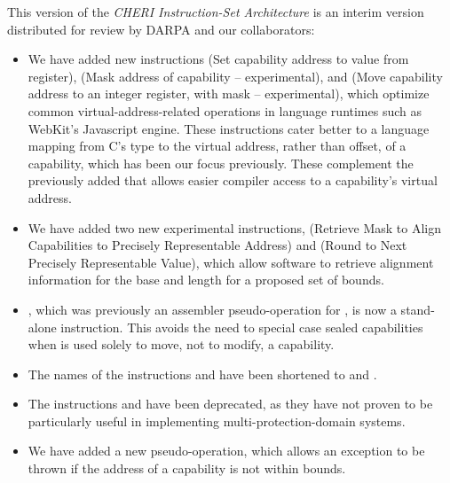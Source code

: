 This version of the \textit{CHERI Instruction-Set Architecture} is an interim
version distributed for review by DARPA and our collaborators:

\begin{itemize}
\item We have added new instructions  (Set capability
  address to value from register),  (Mask address of
  capability -- experimental), and  (Move capability
  address to an integer register, with mask -- experimental), which optimize
  common virtual-address-related operations in language runtimes such as
  WebKit's Javascript engine.
  These instructions cater better to a language mapping from C's
   type to the virtual address, rather than offset, of a
  capability, which has been our focus previously.
  These complement the previously added  that allows
  easier compiler access to a capability's virtual address.

\item We have added two new experimental instructions, 
  (Retrieve Mask to Align Capabilities to Precisely Representable Address) and
   (Round to Next Precisely Representable Value), which
  allow software to retrieve alignment information for the base and length for
  a proposed set of bounds.

\item {}, which was previously an assembler pseudo-operation
  for , is now a stand-alone instruction.
  This avoids the need to special case sealed capabilities when
   is used solely to move, not to modify, a
  capability.

\item The names of the instructions  and
   have been shortened to
   and .

\item The instructions  and 
  have been deprecated, as they have not proven to be particularly useful in
  implementing multi-protection-domain systems.

\item We have added a new pseudo-operation,
   which allows an exception
  to be thrown if the address of a capability is not within bounds.


\end{itemize}

